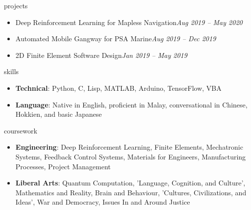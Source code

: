 \documentclass{resume}
\begin{document}
\newpage
\begin{ResumeSection}{projects}
    \begin{itemize}
    \setlength\itemsep{0.05cm}
        \item Deep Reinforcement Learning for Mapless Navigation\hfill{\em{Aug 2019 – May 2020}}
        \item Automated Mobile Gangway for PSA Marine\hfill{\em{Aug 2019 – Dec 2019}}
        \item 2D Finite Element Software Design\hfill{\em{Jan 2019 – May 2019}}
    \end{itemize}
\end{ResumeSection}


\begin{ResumeSection}{skills}
    \begin{itemize}
    \setlength\itemsep{0.05cm}
        \item \textbf{Technical}: Python, C, Lisp, MATLAB, Arduino, TensorFlow, VBA
        \item \textbf{Language}: Native in English, proficient in Malay, conversational in Chinese, Hokkien, and basic Japanese
    \end{itemize}
\end{ResumeSection}

\begin{ResumeSection}{coursework}
    \begin{itemize}
    \setlength\itemsep{0.05cm}
        \item \textbf{Engineering}: Deep Reinforcement Learning, Finite Elements, Mechatronic Systems, Feedback Control Systems, Materials for Engineers, Manufacturing Processes, Project Management
        \item \textbf{Liberal Arts}: Quantum Computation, 'Language, Cognition, and Culture', Mathematics and Reality, Brain and Behaviour, 'Cultures, Civilizations, and Ideas', War and Democracy, Issues In and Around Justice
    \end{itemize}
\end{ResumeSection}
\end{document}
